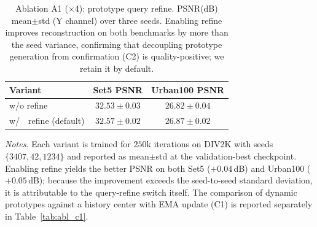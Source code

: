 \begin{table}[t]
\centering
\caption{Ablation A1 ($\times 4$): prototype query refine. PSNR(dB) mean$\pm$std (Y channel)
over three seeds. Enabling refine improves reconstruction on both benchmarks by
more than the seed variance, confirming that decoupling prototype generation from confirmation
(C2) is quality-positive; we retain it by default.}
\label{tab:abl_a1}
\begingroup
\scriptsize
\setlength{\tabcolsep}{3pt}
\renewcommand{\arraystretch}{1.05}
\begin{tabular*}{\columnwidth}{@{\extracolsep{\fill}}lcc}
\toprule
Variant & Set5 PSNR & Urban100 PSNR \\
\midrule
w/o refine               & $32.53\pm0.03$ & $26.82\pm0.04$ \\
w/\ \ refine (default)   & $\mathbf{32.57\pm0.02}$ & $\mathbf{26.87\pm0.02}$ \\
\bottomrule
\end{tabular*}
\endgroup

\vspace{2pt}
{\footnotesize
\textit{Notes.} Each variant is trained for $250$k iterations on DIV2K with seeds
$\{3407,42,1234\}$ and reported as mean$\pm$std at the validation-best checkpoint. Enabling
refine yields the better PSNR on both Set5 ($+0.04$\,dB) and Urban100 ($+0.05$\,dB); because the
improvement exceeds the seed-to-seed standard deviation, it is attributable to the query-refine
switch itself. The comparison of dynamic prototypes against a history center with EMA update
(C1) is reported separately in Table~\ref{tab:abl_c1}.}
\end{table}
